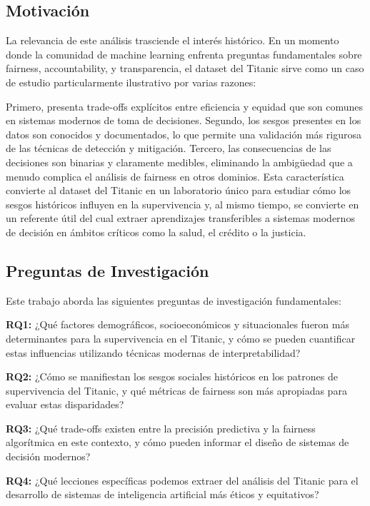 \documentclass[conference]{IEEEtran}
\begin{document}
\subsection{Motivación}

La relevancia de este análisis trasciende el interés histórico. En un momento donde la comunidad de machine learning enfrenta preguntas fundamentales sobre fairness, accountability, y transparencia, el dataset del Titanic sirve como un caso de estudio particularmente ilustrativo por varias razones:

Primero, presenta trade-offs explícitos entre eficiencia y equidad que son comunes en sistemas modernos de toma de decisiones. Segundo, los sesgos presentes en los datos son conocidos y documentados, lo que permite una validación más rigurosa de las técnicas de detección y mitigación. Tercero, las consecuencias de las decisiones son binarias y claramente medibles, eliminando la ambigüedad que a menudo complica el análisis de fairness en otros dominios. Esta característica convierte al dataset del Titanic en un laboratorio único para estudiar cómo los sesgos históricos influyen en la supervivencia y, al mismo tiempo, se convierte en un referente útil del cual extraer aprendizajes transferibles a sistemas modernos de decisión en ámbitos críticos como la salud, el crédito o la justicia.

\subsection{Preguntas de Investigación}

Este trabajo aborda las siguientes preguntas de investigación fundamentales:

\textbf{RQ1:} ¿Qué factores demográficos, socioeconómicos y situacionales fueron más determinantes para la supervivencia en el Titanic, y cómo se pueden cuantificar estas influencias utilizando técnicas modernas de interpretabilidad?

\textbf{RQ2:} ¿Cómo se manifiestan los sesgos sociales históricos en los patrones de supervivencia del Titanic, y qué métricas de fairness son más apropiadas para evaluar estas disparidades?

\textbf{RQ3:} ¿Qué trade-offs existen entre la precisión predictiva y la fairness algorítmica en este contexto, y cómo pueden informar el diseño de sistemas de decisión modernos?

\textbf{RQ4:} ¿Qué lecciones específicas podemos extraer del análisis del Titanic para el desarrollo de sistemas de inteligencia artificial más éticos y equitativos?
\end{document}
